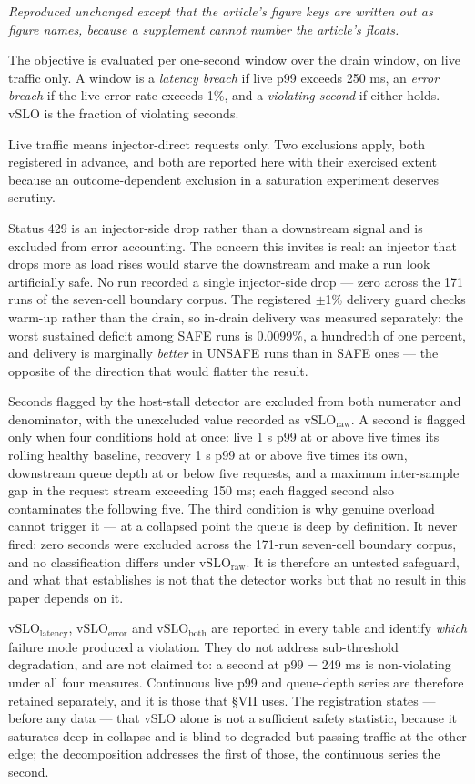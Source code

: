 \documentclass{ieeeaccess}
\begin{document}
\textit{Reproduced unchanged except that the article's figure keys are written out as figure names, because a supplement cannot number the article's floats.}

The objective is evaluated per one-second window over the drain window, on live traffic only. A window is a \textit{latency breach} if live p99 exceeds 250 ms, an \textit{error breach} if the live error rate exceeds 1\%, and a \textit{violating second} if either holds. $\mathrm{vSLO}$ is the fraction of violating seconds.

Live traffic means injector-direct requests only. Two exclusions apply, both registered in advance, and both are reported here with their exercised extent because an outcome-dependent exclusion in a saturation experiment deserves scrutiny.

Status 429 is an injector-side drop rather than a downstream signal and is excluded from error accounting. The concern this invites is real: an injector that drops more as load rises would starve the downstream and make a run look artificially safe. No run recorded a single injector-side drop --- zero across the 171 runs of the seven-cell boundary corpus. The registered $\pm$1\% delivery guard checks warm-up rather than the drain, so in-drain delivery was measured separately: the worst sustained deficit among SAFE runs is 0.0099\%, a hundredth of one percent, and delivery is marginally \textit{better} in UNSAFE runs than in SAFE ones --- the opposite of the direction that would flatter the result.

Seconds flagged by the host-stall detector are excluded from both numerator and denominator, with the unexcluded value recorded as $\mathrm{vSLO}_{\mathrm{raw}}$. A second is flagged only when four conditions hold at once: live 1 s p99 at or above five times its rolling healthy baseline, recovery 1 s p99 at or above five times its own, downstream queue depth at or below five requests, and a maximum inter-sample gap in the request stream exceeding 150 ms; each flagged second also contaminates the following five. The third condition is why genuine overload cannot trigger it --- at a collapsed point the queue is deep by definition. It never fired: zero seconds were excluded across the 171-run seven-cell boundary corpus, and no classification differs under $\mathrm{vSLO}_{\mathrm{raw}}$. It is therefore an untested safeguard, and what that establishes is not that the detector works but that no result in this paper depends on it.

$\mathrm{vSLO}_{\mathrm{latency}}$, $\mathrm{vSLO}_{\mathrm{error}}$ and $\mathrm{vSLO}_{\mathrm{both}}$ are reported in every table and identify \textit{which} failure mode produced a violation. They do not address sub-threshold degradation, and are not claimed to: a second at p99 = 249 ms is non-violating under all four measures. Continuous live p99 and queue-depth series are therefore retained separately, and it is those that \S{}VII uses. The registration states --- before any data --- that $\mathrm{vSLO}$ alone is not a sufficient safety statistic, because it saturates deep in collapse and is blind to degraded-but-passing traffic at the other edge; the decomposition addresses the first of those, the continuous series the second.
\end{document}
